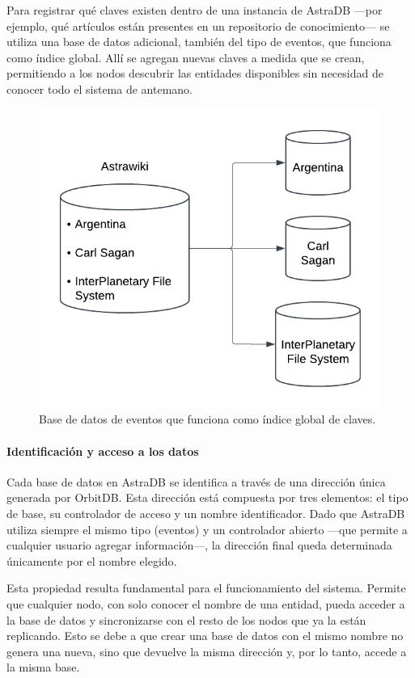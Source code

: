 Para registrar qué claves existen dentro de una instancia de AstraDB —por ejemplo, qué artículos están presentes en un repositorio de conocimiento— se utiliza una base de datos adicional, también del tipo de eventos, que funciona como índice global. Allí se agregan nuevas claves a medida que se crean, permitiendo a los nodos descubrir las entidades disponibles sin necesidad de conocer todo el sistema de antemano.

\begin{figure}[H]
\centering
\includegraphics[width=0.6\linewidth]{img/solucion-ipfs/bdd-wiki.png}
\caption{Base de datos de eventos que funciona como índice global de claves.}
\label{fig:bdd-wiki}
\end{figure}

\paragraph{Identificación y acceso a los datos}

Cada base de datos en AstraDB se identifica a través de una dirección única generada por OrbitDB. Esta dirección está compuesta por tres elementos: el tipo de base, su controlador de acceso y un nombre identificador. Dado que AstraDB utiliza siempre el mismo tipo (eventos) y un controlador abierto —que permite a cualquier usuario agregar información—, la dirección final queda determinada únicamente por el nombre elegido.

Esta propiedad resulta fundamental para el funcionamiento del sistema. Permite que cualquier nodo, con solo conocer el nombre de una entidad, pueda acceder a la base de datos y sincronizarse con el resto de los nodos que ya la están replicando. Esto se debe a que crear una base de datos con el mismo nombre no genera una nueva, sino que devuelve la misma dirección y, por lo tanto, accede a la misma base.



